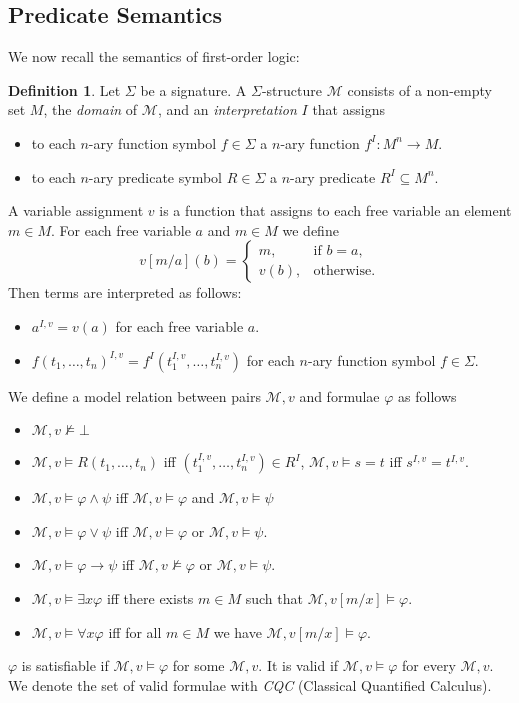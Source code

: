 \documentclass{easychair}
\theoremstyle{definition}
\theoremstyle{definition}
\theoremstyle{definition}
\theoremstyle{definition}
\theoremstyle{definition}
\newtheorem{definition}[theorem]{Definition}
\theoremstyle{definition}
\theoremstyle{definition}
\begin{document}
\subsection{Predicate Semantics}

We now recall the semantics of first-order logic:

\begin{definition}
	Let $\Sigma$ be a signature. A $\Sigma$-structure $\mathcal{M}$ consists of a non-empty set $M$, the \emph{domain} of $\mathcal{M}$, and an \emph{interpretation} $I$ that assigns
	\begin{itemize}\addtolength{\itemsep}{-5pt}
		\item to each $n$-ary function symbol $f\in\Sigma$ a $n$-ary function $f^I: M^n\to M$.
		\item to each $n$-ary predicate symbol $R\in\Sigma$ a $n$-ary predicate $R^I\subseteq M^n$.
	\end{itemize}
	A variable assignment $v$ is a function that assigns to each free variable an element $m\in M$. For each free variable $a$ and $m\in M$ we define $$v[m/a](b) = \begin{cases}
	m, &\text{if $b=a$,}\\
	v(b), &\text{otherwise.}
	\end{cases}$$
	Then terms are interpreted as follows:
	\begin{itemize}\addtolength{\itemsep}{-5pt}
		\item $a^{I, v} = v(a)$ for each free variable $a$.
		\item $f(t_1,\dots,t_n)^{I, v} = f^I(t_1^{I, v},\dots, t_n^{I, v})$ for each $n$-ary function symbol $f\in\Sigma$.
	\end{itemize}
	We define a model relation between pairs $\mathcal M, v$ and formulae $\varphi$ as follows
	\begin{itemize}
		\item $\mathcal M, v\not\models\bot$
		\item $\mathcal M, v\models R(t_1,\dots,t_n)$ iff $(t_1^{I, v},\dots,t_n^{I, v})\in R^I$, $\mathcal M, v\models s = t$ iff $s^{I, v} = t^{I, v}$.
		\item $\mathcal M, v\models \varphi\wedge \psi$ iff $\mathcal M, v\models\varphi$ and $\mathcal M, v\models\psi$
		\item $\mathcal M, v\models \varphi\vee\psi$ iff $\mathcal M, v\models\varphi$ or $\mathcal M, v\models\psi$.
		\item $\mathcal M, v\models \varphi\to\psi$ iff $\mathcal M, v\not\models\varphi$ or $\mathcal M, v\models\psi$.
		\item $\mathcal M, v\models\exists x\varphi$ iff there exists $m\in M$ such that $\mathcal M, v[m/x]\models\varphi$.
		\item $\mathcal M, v\models\forall x\varphi$ iff for all $m\in M$ we have $\mathcal M, v[m/x]\models\varphi$.
	\end{itemize}
	$\varphi$ is satisfiable if $\mathcal M, v\models\varphi$ for some $\mathcal M, v$. It is valid if $\mathcal M, v\models\varphi$ for every $\mathcal M, v$. We denote the set of valid formulae with \emph{CQC} (Classical Quantified Calculus).
\end{definition}
\end{document}
